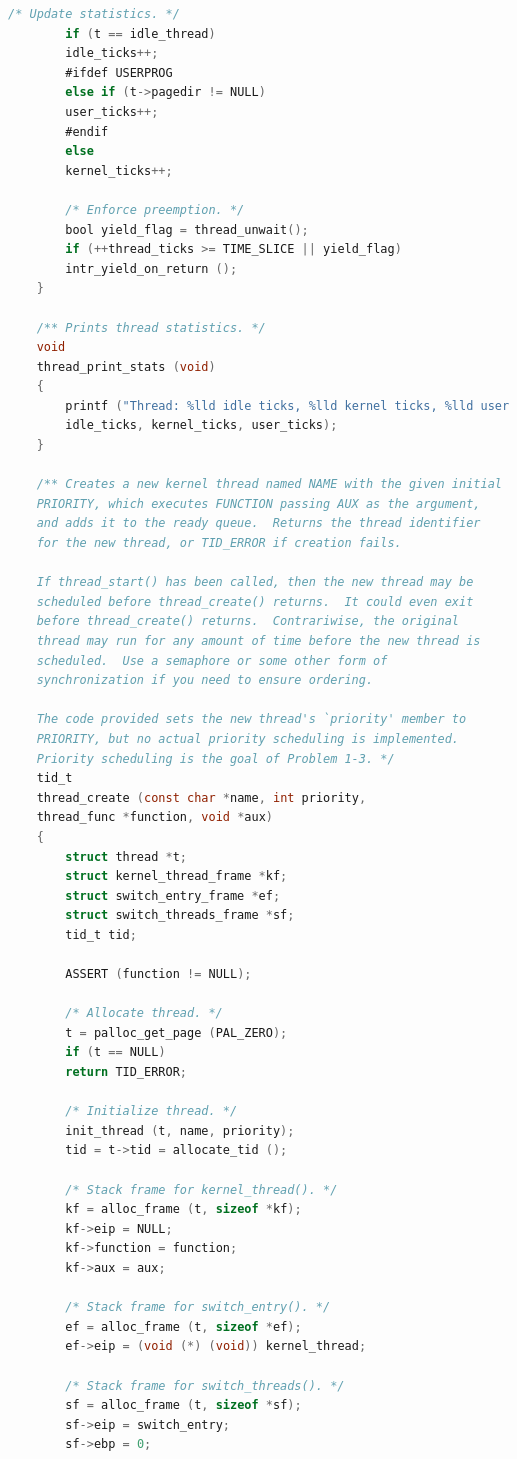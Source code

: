 \documentclass{article}
\begin{document}
\begin{lstlisting}[language=C, title=\texttt{pintos/src/threads/thread.c}]
		/* Update statistics. */
		if (t == idle_thread)
		idle_ticks++;
		#ifdef USERPROG
		else if (t->pagedir != NULL)
		user_ticks++;
		#endif
		else
		kernel_ticks++;
		
		/* Enforce preemption. */
		bool yield_flag = thread_unwait();
		if (++thread_ticks >= TIME_SLICE || yield_flag)
		intr_yield_on_return ();
	}
	
	/** Prints thread statistics. */
	void
	thread_print_stats (void) 
	{
		printf ("Thread: %lld idle ticks, %lld kernel ticks, %lld user ticks\n",
		idle_ticks, kernel_ticks, user_ticks);
	}
	
	/** Creates a new kernel thread named NAME with the given initial
	PRIORITY, which executes FUNCTION passing AUX as the argument,
	and adds it to the ready queue.  Returns the thread identifier
	for the new thread, or TID_ERROR if creation fails.
	
	If thread_start() has been called, then the new thread may be
	scheduled before thread_create() returns.  It could even exit
	before thread_create() returns.  Contrariwise, the original
	thread may run for any amount of time before the new thread is
	scheduled.  Use a semaphore or some other form of
	synchronization if you need to ensure ordering.
	
	The code provided sets the new thread's `priority' member to
	PRIORITY, but no actual priority scheduling is implemented.
	Priority scheduling is the goal of Problem 1-3. */
	tid_t
	thread_create (const char *name, int priority,
	thread_func *function, void *aux) 
	{
		struct thread *t;
		struct kernel_thread_frame *kf;
		struct switch_entry_frame *ef;
		struct switch_threads_frame *sf;
		tid_t tid;
		
		ASSERT (function != NULL);
		
		/* Allocate thread. */
		t = palloc_get_page (PAL_ZERO);
		if (t == NULL)
		return TID_ERROR;
		
		/* Initialize thread. */
		init_thread (t, name, priority);
		tid = t->tid = allocate_tid ();
		
		/* Stack frame for kernel_thread(). */
		kf = alloc_frame (t, sizeof *kf);
		kf->eip = NULL;
		kf->function = function;
		kf->aux = aux;
		
		/* Stack frame for switch_entry(). */
		ef = alloc_frame (t, sizeof *ef);
		ef->eip = (void (*) (void)) kernel_thread;
		
		/* Stack frame for switch_threads(). */
		sf = alloc_frame (t, sizeof *sf);
		sf->eip = switch_entry;
		sf->ebp = 0;
		

\end{lstlisting}
\end{document}
